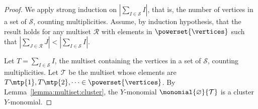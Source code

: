 \begin{proof}
    We apply strong induction on \(\left| \sum_{I \in \mathcal{S}} I \right|\),
    that is, the number of vertices in a set of \(\mathcal{S}\), counting multiplicities.
    Assume, by induction hypothesis, that the result holds for any multiset \(\mathcal{R}\) with elements in \(\powerset{\vertices}\) such that \(\left| \sum_{J \in \mathcal{R}} J \right| < \left| \sum_{I \in \mathcal{S}} I \right|\).

    Let \(T = \sum_{I \in \mathcal{S}} I\), the multiset containing the vertices in a set of \(\mathcal{S}\), counting multiplicities.
    Let \(\mathcal{T}\) be the multiset whose elements are \(T\mtp{1}, T\mtp{2}, \dots \in \powerset{\vertices}\).
    By Lemma~\ref{lemma:multiset:cluster}, the \(Y\)-monomial \(\monomial{\varnothing}{\mathcal{T}}\) is a cluster \(Y\)-monomial.


\end{proof}
